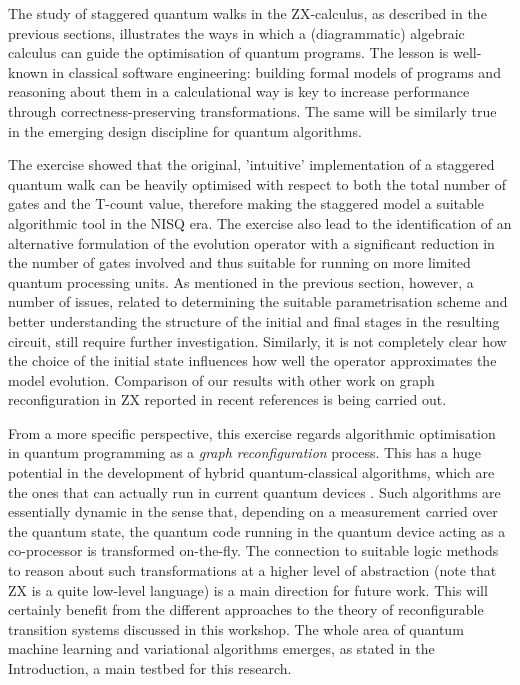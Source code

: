  The study of staggered quantum walks in the ZX-calculus, as described in the previous sections, illustrates the ways in which a (diagrammatic) algebraic calculus can guide the optimisation of quantum programs. The lesson is well-known in classical software engineering: building formal models of programs and reasoning about them in a calculational way is key to increase performance through correctness-preserving transformations. The same will be similarly true in the emerging design discipline for quantum algorithms.




The exercise showed that the original, 'intuitive' implementation of a staggered quantum walk can be heavily optimised with respect to both the total number of gates and the T-count value, therefore making the staggered model a suitable algorithmic tool in the NISQ era\cite{Preskill2018}. The exercise also lead to the identification of an alternative formulation of the evolution operator with a significant reduction in the number of gates involved and thus suitable for running on more limited quantum processing units. As mentioned in the previous section, however, a number of issues, related to determining the  suitable parametrisation scheme and better understanding the structure of the initial and final stages in the resulting circuit,  still require further investigation. Similarly, it is not completely  clear how the choice of the initial state 
influences how well the operator approximates the model evolution. Comparison of our results with other work on graph reconfiguration in ZX reported in recent references \cite{Dun20,Ufr23} is being carried out.


From a more specific perspective, this exercise regards algorithmic optimisation  in quantum programming  as a \emph{graph reconfiguration} process. This has a huge potential in the development of hybrid quantum-classical algorithms, which are the ones that can actually run in current quantum devices \cite{Preskill2018}. Such algorithms are essentially dynamic in the sense that, depending on a measurement carried over the quantum state, the quantum code running in the quantum device acting as a co-processor is transformed on-the-fly. The connection to suitable logic methods to reason about such transformations at a higher level of abstraction (note that ZX is a quite low-level language) is a main direction for future work. This will certainly benefit from the different approaches to the theory of reconfigurable transition systems discussed in this workshop. The whole area of quantum machine learning and variational algorithms  \cite{Dun16,Cer21} emerges, as stated in the Introduction, a main testbed for this research.

